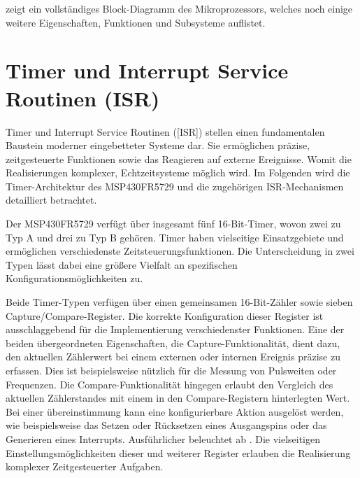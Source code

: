 \newpage
{} zeigt ein vollst\"andiges Block-Diagramm des Mikroprozessors, welches noch einige weitere Eigenschaften, Funktionen und Subsysteme auflistet.\AI


\section{Timer und Interrupt Service Routinen (ISR)}
\label{sec:TIMER&ISR}

Timer und Interrupt Service Routinen ([ISR]) stellen einen fundamentalen Baustein moderner eingebetteter Systeme dar. Sie erm\"oglichen pr\"azise, zeitgesteuerte Funktionen sowie das Reagieren auf externe Ereignisse. Womit die Realisierungen komplexer, Echtzeitsysteme m\"oglich wird. Im Folgenden wird die Timer-Architektur des MSP430FR5729 und die zugeh\"origen ISR-Mechanismen detailliert betrachtet.

Der MSP430FR5729 verf\"ugt \"uber insgesamt f\"unf 16-Bit-Timer, wovon zwei zu Typ A und drei zu Typ B geh\"oren. Timer haben vielseitige Einsatzgebiete und erm\"oglichen verschiedenste Zeitsteuerungsfunktionen. Die Unterscheidung in zwei Typen l\"asst dabei eine gr\"o{\ss}ere Vielfalt an spezifischen Konfigurationsm\"oglichkeiten zu.

\newpage
Beide Timer-Typen verf\"ugen \"uber einen gemeinsamen 16-Bit-Z\"ahler sowie sieben Capture/Compare-Register. Die korrekte Konfiguration dieser Register ist ausschlaggebend f\"ur die Implementierung verschiedenster Funktionen. Eine der beiden \"ubergeordneten Eigenschaften, die Capture-Funktionalit\"at, dient dazu, den aktuellen Z\"ahlerwert bei einem externen oder internen Ereignis pr\"azise zu erfassen. Dies ist beispielsweise n\"utzlich f\"ur die Messung von Pulsweiten oder Frequenzen. Die Compare-Funktionalit\"at hingegen erlaubt den Vergleich des aktuellen Z\"ahlerstandes mit einem in den Compare-Registern hinterlegten Wert. Bei einer \"ubereinstimmung kann eine konfigurierbare Aktion ausgel\"ost werden, wie beispielsweise das Setzen oder R\"ucksetzen eines Ausgangspins oder das Generieren eines Interrupts. Ausf\"uhrlicher beleuchtet ab . Die vielseitigen Einstellungsm\"oglichkeiten dieser und weiterer Register erlauben die Realisierung komplexer Zeitgesteuerter Aufgaben. 

